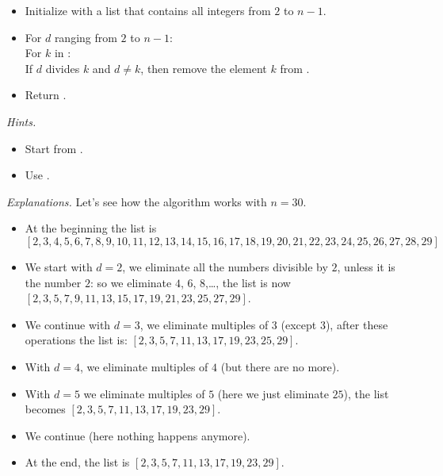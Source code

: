 \documentclass[11pt,class=report,crop=false]{standalone}
\begin{document}
\begin{activite}[Arithmetic]
\begin{enumerate}
\begin{algorithme}
\begin{itemize}
  
  \item Initialize  with a list that contains all integers from $2$ to $n-1$. 
   
   \item For $d$ ranging from $2$ to $n-1$:\\
   \indentation For $k$ in :\\
   \indentation\indentation If $d$ divides $k$ and $d \neq k$, then
remove the element $k$ from .
   \item Return .
 \end{itemize}  
 \end{algorithme}
 

  \emph{Hints.}  
  \begin{itemize}
    \item Start from .
    \item Use .
   \end{itemize} 
   
   \medskip
   
  \emph{Explanations.}
  Let's see how the algorithm works with $n=30$.
  \begin{itemize}
    \item At the beginning the list is 
    $$[2,3,4,5,6,7,8,9,10,11,12,13,14,15,16,17,18,19,20,21,22,23,24,25,26,27,28,29]$$
    
    \item We start with $d=2$, we eliminate all the numbers divisible by $2$, unless it is the number $2$: so we eliminate $4$, $6$, $8$,\ldots, the list is now $[2,3,5,7,9,11,13,15,17,19,21,23,25,27,29]$.
    \item We continue with $d=3$, we eliminate multiples of $3$ (except $3$), after these operations the list is: $[2,3,5,7,11,13,17,19,23,25,29]$.
    \item With $d=4$, we eliminate multiples of $4$ (but there are no more).
    \item With $d=5$ we eliminate multiples of $5$ (here we just eliminate $25$), the list becomes $[2,3,5,7,11,13,17,19,23,29]$.
    \item We continue (here nothing happens anymore).
    
    \item At the end, the list is $[2,3,5,7,11,13,17,19,23,29]$.
  \end{itemize}
     
\end{enumerate}

\end{activite}
\end{document}
